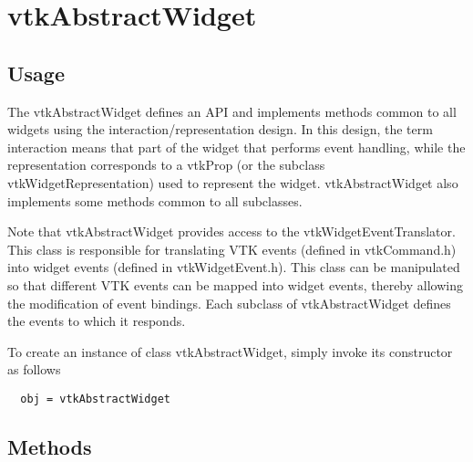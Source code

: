 \section{vtkAbstractWidget}

\subsection{Usage}

 The vtkAbstractWidget defines an API and implements methods common to all
 widgets using the interaction/representation design. In this design, the
 term interaction means that part of the widget that performs event
 handling, while the representation corresponds to a vtkProp (or the
 subclass vtkWidgetRepresentation) used to represent the
 widget. vtkAbstractWidget also implements some methods common to all
 subclasses.

 Note that vtkAbstractWidget provides access to the
 vtkWidgetEventTranslator.  This class is responsible for translating VTK
 events (defined in vtkCommand.h) into widget events (defined in
 vtkWidgetEvent.h).  This class can be manipulated so that different VTK
 events can be mapped into widget events, thereby allowing the modification
 of event bindings. Each subclass of vtkAbstractWidget defines the events
 to which it responds.


To create an instance of class vtkAbstractWidget, simply
invoke its constructor as follows
\begin{verbatim}
  obj = vtkAbstractWidget
\end{verbatim}
\subsection{Methods}

